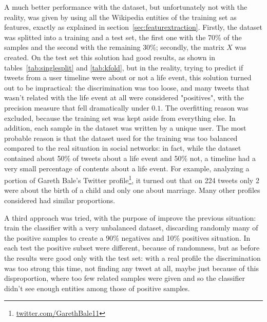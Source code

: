 A much better performance with the dataset, but unfortunately not with the reality, was given by using all the Wikipedia entities of the training set as features, exactly as explained in section~\ref{sec:featurextraction}. Firstly, the dataset was splitted into a training and a test set, the first one with the 70\% of the samples and the second with the remaining 30\%; secondly, the matrix $X$ was created. On the test set this solution had good results, as shown in tables~\ref{tab:singlesplit} and \ref{tab:kfold}, but in the reality, trying to predict if tweets from a user timeline were about or not a life event, this solution turned out to be impractical: the discrimination was too loose, and many tweets that wasn't related with the life event at all were considered "positives", with the precision measure that fell dramatically under $0.1$. The overfitting reason was excluded, because the training set was kept aside from everything else. In addition, each sample in the dataset was written by a unique user. The most probable reason is that the dataset used for the training was too balanced compared to the real situation in social networks: in fact, while the dataset contained about 50\% of tweets about a life event and 50\% not, a timeline had a very small percentage of contents about a life event. For example, analyzing a portion of Gareth Bale's Twitter profile\footnote{\url{twitter.com/GarethBale11}}, it turned out that on 224 tweets only 2 were about the birth of a child and only one about marriage. Many other profiles considered had similar proportions.

A third approach was tried, with the purpose of improve the previous situation: train the classifier with a very unbalanced dataset, discarding randomly many of the positive samples to create a 90\% negatives and 10\% positives situation. In each test the positive subset were different, because of randomness, but as before the results were good only with the test set: with a real profile the discrimination was too strong this time, not finding any tweet at all, maybe just because of this disproportion, where too few related samples were given and so the classifier didn't see enough entities among those of positive samples.

